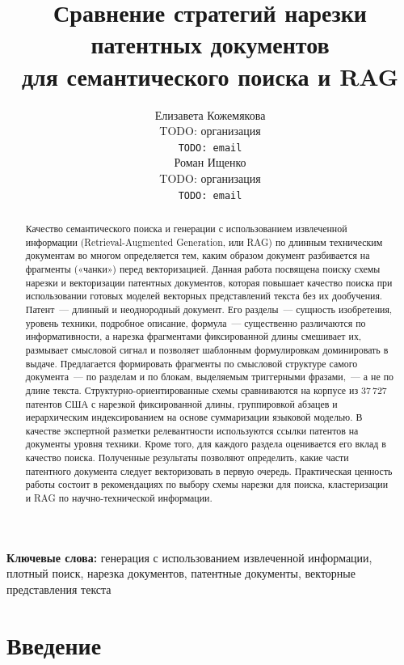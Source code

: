 \documentclass{article}
\title{Сравнение стратегий нарезки патентных документов\\для семантического поиска и RAG}
\author{
  Елизавета Кожемякова\\
  TODO: организация\\
  \texttt{TODO: email}\\
  \And
  Роман Ищенко\\
  TODO: организация\\
  \texttt{TODO: email}\\
}
\begin{document}
\maketitle

\begin{abstract}
Качество семантического поиска и генерации с использованием извлеченной информации (Retrieval-Augmented Generation, или RAG) по длинным техническим документам во многом определяется тем, каким образом документ разбивается на фрагменты («чанки») перед векторизацией. Данная работа посвящена поиску схемы нарезки и векторизации патентных документов, которая повышает качество поиска при использовании готовых моделей векторных представлений текста без их дообучения. Патент~--- длинный и неоднородный документ. Его разделы~--- сущность изобретения, уровень техники, подробное описание, формула~--- существенно различаются по информативности, а нарезка фрагментами фиксированной длины смешивает их, размывает смысловой сигнал и позволяет шаблонным формулировкам доминировать в выдаче. Предлагается формировать фрагменты по смысловой структуре самого документа~--- по разделам и по блокам, выделяемым триггерными фразами,~--- а не по длине текста. Структурно-ориентированные схемы сравниваются на корпусе из 37\,727 патентов США с нарезкой фиксированной длины, группировкой абзацев и иерархическим индексированием на основе суммаризации языковой моделью. В качестве экспертной разметки релевантности используются ссылки патентов на документы уровня техники. Кроме того, для каждого раздела оценивается его вклад в качество поиска.
Полученные результаты позволяют определить, какие части патентного документа следует векторизовать в первую очередь. Практическая ценность работы состоит в рекомендациях по выбору схемы нарезки для поиска, кластеризации и RAG по научно-технической информации.
\end{abstract}

\textbf{Ключевые слова:} генерация с использованием извлеченной информации, плотный поиск, нарезка документов, патентные документы, векторные представления текста

\section{Введение}\label{sec:intro}
\end{document}
